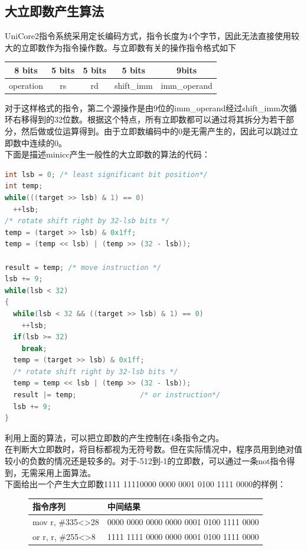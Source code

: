 \documentclass[12pt,a4paper,Flow]{report}
\begin{document}
\subsection{大立即数产生算法}
UniCore2指令系统采用定长编码方式，指令长度为4个字节，因此无法直接使用较大的立即数作为指令操作数。与立即数有关的操作指令格式如下
\begin{center}
  \begin{tabular}{ccccc}
    8 bits & 5 bits & 5 bits & 5 bits & 9bits \\
    \hline
    operation \cellcolor{rgb:red,2;green,1;yellow,1}& rs\cellcolor{rgb:red,0;green,1;yellow,1} & rd\cellcolor{rgb:red,0;green,0;blue,1} & shift\_imm \cellcolor[gray]{.9}& imm\_operand \cellcolor{rgb:red,5;green,0;yellow,0}\\
    \hline
  \end{tabular}
\end{center}
对于这样格式的指令，第二个源操作是由9位的imm\_operand经过shift\_imm次循环右移得到的32位数。根据这个特点，所有立即数都可以通过将其拆分为若干部分，然后做或位运算得到。由于立即数编码中的0是无需产生的，因此可以跳过立即数中连续的0。\\
\indent 下面是描述minicc产生一般性的大立即数的算法的代码：
\begin{lstlisting}[language=c]
int lsb = 0; /* least significant bit position*/
int temp;
while(((target >> lsb) & 1) == 0)
  ++lsb;
/* rotate shift right by 32-lsb bits */
temp = (target >> lsb) & 0x1ff;
temp = (temp << lsb) | (temp >> (32 - lsb));

result = temp; /* move instruction */
lsb += 9;
while(lsb < 32)
{
  while(lsb < 32 && ((target >> lsb) & 1) == 0)
    ++lsb;
  if(lsb >= 32)
    break;
  temp = (target >> lsb) & 0x1ff;
  /* rotate shift right by 32-lsb bits */
  temp = temp << lsb | (temp >> (32 - lsb));
  result |= temp;               /* or instruction*/
  lsb += 9;
}
\end{lstlisting}
利用上面的算法，可以把立即数的产生控制在4条指令之内。\\
\indent 在判断大立即数时，将目标都视为无符号数。但在实际情况中，程序员用到绝对值较小的负数的情况还是较多的。对于-512到-1的立即数，可以通过一条not指令得到，无需采用上面算法。\\
\indent 下面给出一个产生大立即数{\color{red}1111 11110000 0000 0001 0100 1111 0000}的样例：
\begin{figure}[H]
\centering
\begin{tabular}{|l|l|}
\hline
指令序列 & 中间结果\\
\hline
 mov r, \#335<>28  & 0000 0000 0000 0000 000{\color{red}1 0100 1111} 0000 \\
\hline
or r, r, \#255<>8  & {\color{red}1111 1111} 0000 0000 0001 0100 1111 0000 \\
\hline
\end{tabular}
\end{figure}
\end{document}
